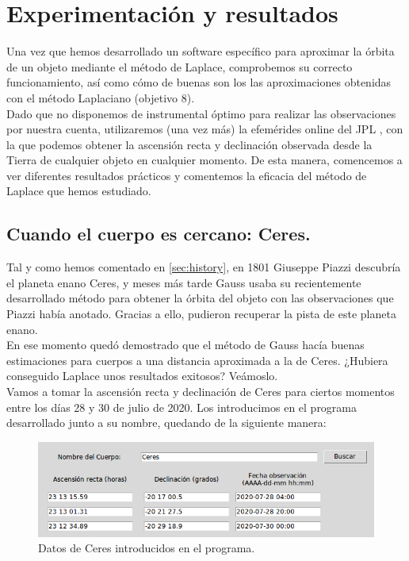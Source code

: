 
\chapter{Experimentación y resultados}
\label{chap:experimentation}
Una vez que hemos desarrollado un software específico para aproximar la órbita de un objeto mediante el método de Laplace, comprobemos su correcto funcionamiento, así como cómo de buenas son los las aproximaciones obtenidas con el método Laplaciano (objetivo 8).\\

Dado que no disponemos de instrumental óptimo para realizar las observaciones por nuestra cuenta, utilizaremos (una vez más) la efemérides online del JPL \cite{jpl}, con la que podemos obtener la ascensión recta y declinación observada desde la Tierra de cualquier objeto en cualquier momento. De esta manera, comencemos a ver diferentes resultados prácticos y comentemos la eficacia del método de Laplace que hemos estudiado.\\

\section{Cuando el cuerpo es cercano: Ceres.}
\label{sec:exp_ceres}
Tal y como hemos comentado en \ref{sec:history}, en 1801 Giuseppe Piazzi descubría el planeta enano Ceres, y meses más tarde Gauss usaba su recientemente desarrollado método para obtener la órbita del objeto con las observaciones que Piazzi había anotado. Gracias a ello, pudieron recuperar la pista de este planeta enano.\\

En ese momento quedó demostrado que el método de Gauss hacía buenas estimaciones para cuerpos a una distancia aproximada a la de Ceres. ¿Hubiera conseguido Laplace unos resultados exitosos? Veámoslo.\\

Vamos a tomar la ascensión recta y declinación de Ceres para ciertos momentos entre los días 28 y 30 de julio de 2020. Los introducimos en el programa desarrollado junto a su nombre, quedando de la siguiente manera:
\begin{figure}[H]
\centering
\includegraphics[scale=0.5]{images/ceres_exp.png}
\caption{Datos de Ceres introducidos en el programa.}
\label{fig:ceres_exp}
\end{figure}


